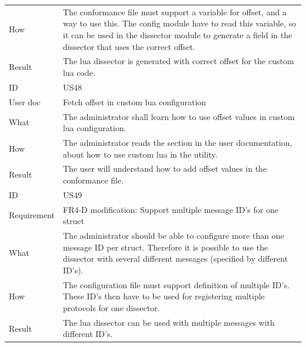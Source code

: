 \begin{table}[htbp]
{\begin{tabularx}{1.2\textwidth}{l X}
	How & The conformance file must support a variable for offset, and a way to use this. The config module have to read this variable, so it can be used in the \gls{dissector} module to generate a field in the \gls{dissector} that uses the correct offset. \\
	Result & The \Gls{lua} \gls{dissector} is generated with correct offset for the custom \Gls{lua} code. \\	
	\midrule
	ID & US48 \\
	User doc & Fetch offset in custom \Gls{lua} configuration  \\
	What & The administrator shall learn how to use offset values in custom \Gls{lua} configuration.   \\
	How & The administrator reads the section in the user documentation, about how to use custom \Gls{lua} in the \gls{utility}.  \\
	Result & The user will understand how to add offset values in the conformance file. \\
	\midrule
	ID & US49 \\
	Requirement & FR4-D modification: Support multiple message ID's for one \gls{struct} \\
	What & The administrator should be able to configure more than one message ID per \gls{struct}. Therefore it is possible to use the \gls{dissector} with several different messages (specified by different ID’s).    \\
	How & The configuration file must support definition of multiple ID’s. These ID’s then have to be used for registering multiple \glspl{protocol} for one \gls{dissector}.  \\
	Result & The \Gls{lua} \gls{dissector} can be used with multiple messages with different ID’s. \\
	\bottomrule
\end{tabularx}}
\end{table}

